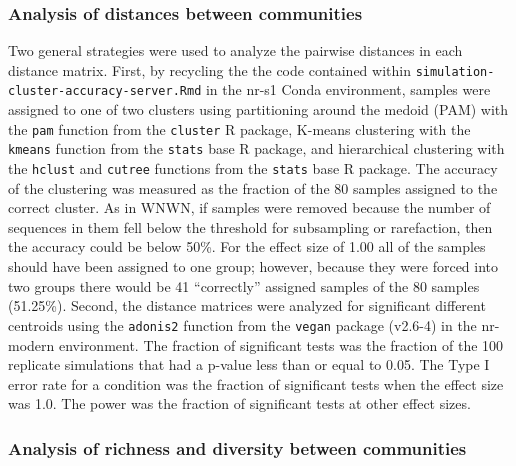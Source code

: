 \documentclass[
]{article}
\begin{document}
\hypertarget{analysis-of-distances-between-communities}{%
\subsubsection{Analysis of distances between
communities}\label{analysis-of-distances-between-communities}}

Two general strategies were used to analyze the pairwise distances in
each distance matrix. First, by recycling the the code contained within
\texttt{simulation-cluster-accuracy-server.Rmd} in the nr-s1 Conda
environment, samples were assigned to one of two clusters using
partitioning around the medoid (PAM) with the \texttt{pam} function from
the \texttt{cluster} R package, K-means clustering with the
\texttt{kmeans} function from the \texttt{stats} base R package, and
hierarchical clustering with the \texttt{hclust} and \texttt{cutree}
functions from the \texttt{stats} base R package. The accuracy of the
clustering was measured as the fraction of the 80 samples assigned to
the correct cluster. As in WNWN, if samples were removed because the
number of sequences in them fell below the threshold for subsampling or
rarefaction, then the accuracy could be below 50\%. For the effect size
of 1.00 all of the samples should have been assigned to one group;
however, because they were forced into two groups there would be 41
``correctly'' assigned samples of the 80 samples (51.25\%). Second, the
distance matrices were analyzed for significant different centroids
using the \texttt{adonis2} function from the \texttt{vegan} package
(v2.6-4) in the nr-modern environment. The fraction of significant tests
was the fraction of the 100 replicate simulations that had a p-value
less than or equal to 0.05. The Type I error rate for a condition was
the fraction of significant tests when the effect size was 1.0. The
power was the fraction of significant tests at other effect sizes.

\hypertarget{analysis-of-richness-and-diversity-between-communities}{%
\subsubsection{Analysis of richness and diversity between
communities}\label{analysis-of-richness-and-diversity-between-communities}}
\end{document}
